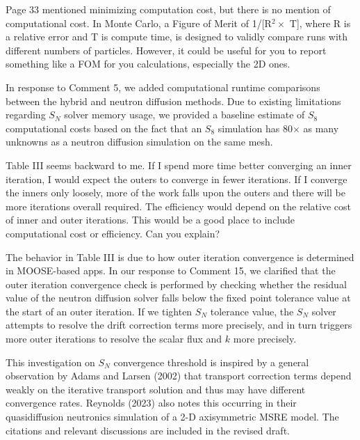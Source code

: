 \documentclass[answers,11pt]{exam}
\begin{document}
\begin{questions}
    \question Page 33 mentioned minimizing computation cost, but there is no mention of computational cost. In Monte Carlo, a Figure of Merit of 1/[R$^2\times$ T], where R is a relative error and T is compute time, is designed to validly compare runs with different numbers of particles. However, it could be useful for you to report something like a FOM for you calculations, especially the 2D ones.
    \begin{solution}
        In response to Comment 5, we added computational runtime comparisons between the hybrid and
        neutron diffusion methods. Due to existing limitations regarding $S_N$ solver memory usage,
        we provided a baseline estimate of $S_8$ computational costs
        based on the fact that an $S_8$ simulation has 80$\times$ as many unknowns as a neutron
        diffusion simulation on the same mesh.
    \end{solution}

    \question Table III seems backward to me. If I spend more time better converging an inner iteration, I would expect the outers to converge in fewer iterations. If I converge the inners only loosely, more of the work falls upon the outers and there will be more iterations overall required. The efficiency would depend on the relative cost of inner and outer iterations. This would be a good place to include computational cost or efficiency. Can you explain?
    \begin{solution}
        The behavior in Table III is due to how outer iteration convergence is determined in
        MOOSE-based apps. In our response to Comment 15, we clarified that the outer iteration
        convergence check is performed by checking whether the residual value of the neutron diffusion
        solver falls below the fixed point tolerance value at the start of an outer iteration. If
        we tighten $S_N$ tolerance value, the $S_N$ solver attempts to resolve the drift correction
        terms more precisely, and in turn triggers more outer iterations to resolve the scalar
        flux and $k$ more precisely.

        This investigation on $S_N$ convergence threshold is inspired by a general observation by
        Adams and Larsen (2002) that transport
        correction terms depend weakly on the iterative transport solution and thus may have
        different convergence rates. Reynolds (2023) also notes this occurring in their
        quasidiffusion neutronics simulation of a 2-D axisymmetric MSRE model. The citations and
        relevant discussions are included in the revised draft.
    \end{solution}


\end{questions}
\end{document}
